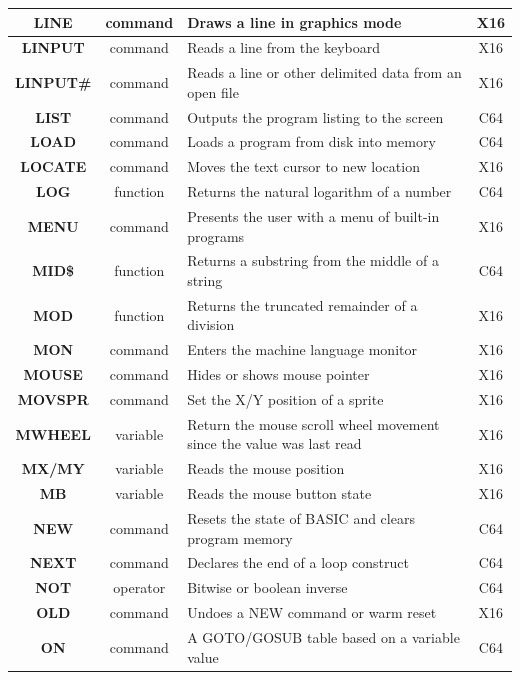 \begin{longtable}{|c|c|m{4cm}|c|}
	{\bfseries LINE} & command & Draws a line in graphics mode & X16 \\ \hline
	{\bfseries LINPUT} & command & Reads a line from the keyboard & X16 \\ \hline
	{\bfseries LINPUT\#} & command & Reads a line or other delimited data from an open file & X16 \\ \hline
	{\bfseries LIST} & command & Outputs the program listing to the screen & C64 \\ \hline
	{\bfseries LOAD} & command & Loads a program from disk into memory & C64 \\ \hline
	{\bfseries LOCATE} & command & Moves the text cursor to new location & X16 \\ \hline
	{\bfseries LOG} & function & Returns the natural logarithm of a number & C64 \\ \hline
	{\bfseries MENU} & command & Presents the user with a menu of built-in programs & X16 \\ \hline
	{\bfseries MID\$} & function & Returns a substring from the middle of a string & C64 \\ \hline
	{\bfseries MOD} & function & Returns the truncated remainder of a division & X16 \\ \hline
	{\bfseries MON} & command & Enters the machine language monitor & X16 \\ \hline
	{\bfseries MOUSE} & command & Hides or shows mouse pointer & X16 \\ \hline
	{\bfseries MOVSPR} & command & Set the X/Y position of a sprite & X16 \\ \hline
	{\bfseries MWHEEL} & variable & Return the mouse scroll wheel movement since the value was last read & X16 \\ \hline
	{\bfseries MX/MY} & variable & Reads the mouse position & X16 \\ \hline
	{\bfseries MB} & variable & Reads the mouse button state & X16 \\ \hline
	{\bfseries NEW} & command & Resets the state of BASIC and clears program memory & C64 \\ \hline
	{\bfseries NEXT} & command & Declares the end of a loop construct & C64 \\ \hline
	{\bfseries NOT} & operator & Bitwise or boolean inverse & C64 \\ \hline
	{\bfseries OLD} & command & Undoes a NEW command or warm reset & X16 \\ \hline
	{\bfseries ON} & command & A GOTO/GOSUB table based on a variable value & C64 \\ \hline

\end{longtable}
